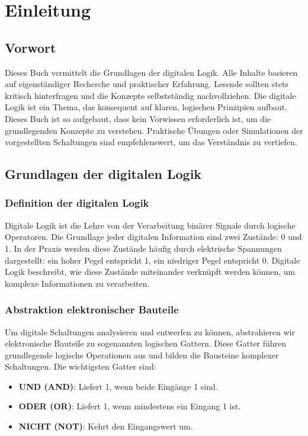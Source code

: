 \chapter{Einleitung}

\section*{Vorwort}
Dieses Buch vermittelt die Grundlagen der digitalen Logik. Alle Inhalte basieren auf eigenständiger Recherche und praktischer Erfahrung. 
Lesende sollten stets kritisch hinterfragen und die Konzepte selbstständig nachvollziehen. 
Die digitale Logik ist ein Thema, das konsequent auf klaren, logischen Prinzipien aufbaut. 
Dieses Buch ist so aufgebaut, dass kein Vorwissen erforderlich ist, um die grundlegenden Konzepte zu verstehen. 
Praktische Übungen oder Simulationen der vorgestellten Schaltungen sind empfehlenswert, um das Verständnis zu vertiefen.

\section{Grundlagen der digitalen Logik}

\subsection{Definition der digitalen Logik}
Digitale Logik ist die Lehre von der Verarbeitung binärer Signale durch logische Operatoren. 
Die Grundlage jeder digitalen Information sind zwei Zustände: 0 und 1. 
In der Praxis werden diese Zustände häufig durch elektrische Spannungen dargestellt: ein hoher Pegel entspricht 1, ein niedriger Pegel entspricht 0. 
Digitale Logik beschreibt, wie diese Zustände miteinander verknüpft werden können, um komplexe Informationen zu verarbeiten.

\subsection{Abstraktion elektronischer Bauteile}
Um digitale Schaltungen analysieren und entwerfen zu können, abstrahieren wir elektronische Bauteile zu sogenannten logischen Gattern. 
Diese Gatter führen grundlegende logische Operationen aus und bilden die Bausteine komplexer Schaltungen. 
Die wichtigsten Gatter sind:
\begin{itemize}
    \item \textbf{UND (AND)}: Liefert 1, wenn beide Eingänge 1 sind.
    \item \textbf{ODER (OR)}: Liefert 1, wenn mindestens ein Eingang 1 ist.
    \item \textbf{NICHT (NOT)}: Kehrt den Eingangswert um.
\end{itemize}

